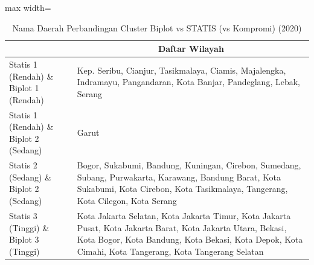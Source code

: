 \begin{table}[H]
\centering
\caption{Nama Daerah Perbandingan Cluster Biplot vs STATIS (vs Kompromi) (2020)} \label{tab:app1biplot_statis_name_2020}
\begin{adjustbox}{max width=\textwidth}
\begin{tabular}{|>{\centering\arraybackslash}p{4cm}|p{10cm}|}
\hline
\multicolumn{1}{|c|}{\textbf{Kategori}} & \multicolumn{1}{c|}{\textbf{Daftar Wilayah}} \\
\hline
Statis 1 (Rendah) \& Biplot 1 (Rendah) & Kep. Seribu, Cianjur, Tasikmalaya, Ciamis, Majalengka, Indramayu, Pangandaran, Kota Banjar, Pandeglang, Lebak, Serang \\
\hline
Statis 1 (Rendah) \& Biplot 2 (Sedang) & Garut \\
\hline
Statis 2 (Sedang) \& Biplot 2 (Sedang) & Bogor, Sukabumi, Bandung, Kuningan, Cirebon, Sumedang, Subang, Purwakarta, Karawang, Bandung Barat, Kota Sukabumi, Kota Cirebon, Kota Tasikmalaya, Tangerang, Kota Cilegon, Kota Serang \\
\hline
Statis 3 (Tinggi) \& Biplot 3 (Tinggi) & Kota Jakarta Selatan, Kota Jakarta Timur, Kota Jakarta Pusat, Kota Jakarta Barat, Kota Jakarta Utara, Bekasi, Kota Bogor, Kota Bandung, Kota Bekasi, Kota Depok, Kota Cimahi, Kota Tangerang, Kota Tangerang Selatan \\
\hline
\end{tabular}
\end{adjustbox}
\end{table}